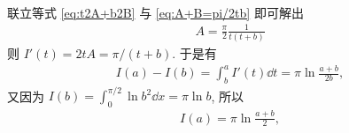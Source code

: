 \documentclass{ctexart}
\begin{document}
\begin{exercise}[resume=exer]
\begin{answer}
\begin{align}
            \end{align}  
            联立等式 \eqref{eq:t2A+b2B} 与 \eqref{eq:A+B=pi/2tb} 即可解出
            \begin{align*}
                A = \frac{\pi}{2}\frac{1}{t(t + b)}
            \end{align*}
            则 $ I'(t) = 2tA = \pi/(t + b) $. 于是有
            \begin{align*}
                I(a) - I(b) = \int_{b}^{a} I'(t) \dd{t} = \pi\ln\frac{a + b}{2b},
            \end{align*} 
            又因为 $ I(b) = \int_{0}^{\pi/2}\ln b^{2} \dd{x} = \pi\ln b $, 所以
            \begin{align*}
                I(a) = \pi\ln\frac{a + b}{2},
            \end{align*}
            

\end{answer}
\end{exercise}
\end{document}
